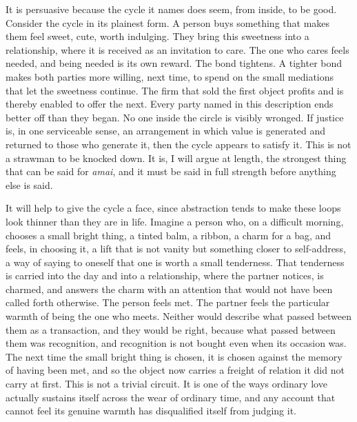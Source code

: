 It is persuasive because the cycle it names does seem, from inside, to be good. Consider the cycle in its plainest form. A person buys something that makes them feel sweet, cute, worth indulging. They bring this sweetness into a relationship, where it is received as an invitation to care. The one who cares feels needed, and being needed is its own reward. The bond tightens. A tighter bond makes both parties more willing, next time, to spend on the small mediations that let the sweetness continue. The firm that sold the first object profits and is thereby enabled to offer the next. Every party named in this description ends better off than they began. No one inside the circle is visibly wronged. If justice is, in one serviceable sense, an arrangement in which value is generated and returned to those who generate it, then the cycle appears to satisfy it. This is not a strawman to be knocked down. It is, I will argue at length, the strongest thing that can be said for \textit{amai}, and it must be said in full strength before anything else is said.

It will help to give the cycle a face, since abstraction tends to make these loops look thinner than they are in life. Imagine a person who, on a difficult morning, chooses a small bright thing, a tinted balm, a ribbon, a charm for a bag, and feels, in choosing it, a lift that is not vanity but something closer to self-address, a way of saying to oneself that one is worth a small tenderness. That tenderness is carried into the day and into a relationship, where the partner notices, is charmed, and answers the charm with an attention that would not have been called forth otherwise. The person feels met. The partner feels the particular warmth of being the one who meets. Neither would describe what passed between them as a transaction, and they would be right, because what passed between them was recognition, and recognition is not bought even when its occasion was. The next time the small bright thing is chosen, it is chosen against the memory of having been met, and so the object now carries a freight of relation it did not carry at first. This is not a trivial circuit. It is one of the ways ordinary love actually sustains itself across the wear of ordinary time, and any account that cannot feel its genuine warmth has disqualified itself from judging it.

